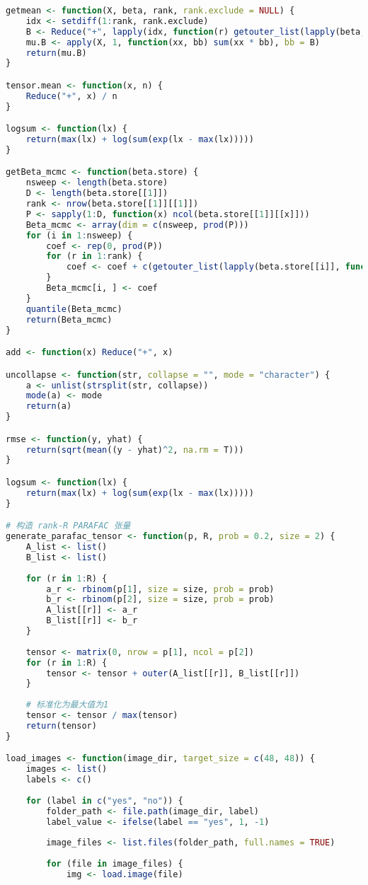 \documentclass[AutoFakeBold]{LZUThesis}
\begin{document}
\begin{lstlisting}[language=R, caption = {BT-SVM}算法]
getmean <- function(X, beta, rank, rank.exclude = NULL) {
	idx <- setdiff(1:rank, rank.exclude)
	B <- Reduce("+", lapply(idx, function(r) getouter_list(lapply(beta, function(x) x[r, ]))))
	mu.B <- apply(X, 1, function(xx, bb) sum(xx * bb), bb = B)
	return(mu.B)
}

tensor.mean <- function(x, n) {
	Reduce("+", x) / n
}

logsum <- function(lx) {
	return(max(lx) + log(sum(exp(lx - max(lx)))))
}

getBeta_mcmc <- function(beta.store) {
	nsweep <- length(beta.store)
	D <- length(beta.store[[1]])
	rank <- nrow(beta.store[[1]][[1]])
	P <- sapply(1:D, function(x) ncol(beta.store[[1]][[x]]))
	Beta_mcmc <- array(dim = c(nsweep, prod(P)))
	for (i in 1:nsweep) {
		coef <- rep(0, prod(P))
		for (r in 1:rank) {
			coef <- coef + c(getouter_list(lapply(beta.store[[i]], function(x) x[r, ])))
		}
		Beta_mcmc[i, ] <- coef
	}
	quantile(Beta_mcmc)
	return(Beta_mcmc)
}

add <- function(x) Reduce("+", x)

uncollapse <- function(str, collapse = "", mode = "character") {
	a <- unlist(strsplit(str, collapse))
	mode(a) <- mode
	return(a)
}

rmse <- function(y, yhat) {
	return(sqrt(mean((y - yhat)^2, na.rm = T)))
}

logsum <- function(lx) {
	return(max(lx) + log(sum(exp(lx - max(lx)))))
}

# 构造 rank-R PARAFAC 张量
generate_parafac_tensor <- function(p, R, prob = 0.2, size = 2) {
	A_list <- list()
	B_list <- list()
	
	for (r in 1:R) {
		a_r <- rbinom(p[1], size = size, prob = prob)
		b_r <- rbinom(p[2], size = size, prob = prob)
		A_list[[r]] <- a_r
		B_list[[r]] <- b_r
	}
	
	tensor <- matrix(0, nrow = p[1], ncol = p[2])
	for (r in 1:R) {
		tensor <- tensor + outer(A_list[[r]], B_list[[r]])
	}
	
	# 标准化为最大值为1
	tensor <- tensor / max(tensor)
	return(tensor)
}

load_images <- function(image_dir, target_size = c(48, 48)) {
	images <- list()
	labels <- c()
	
	for (label in c("yes", "no")) {
		folder_path <- file.path(image_dir, label)
		label_value <- ifelse(label == "yes", 1, -1)
		
		image_files <- list.files(folder_path, full.names = TRUE)
		
		for (file in image_files) {
			img <- load.image(file)
			

\end{lstlisting}
\end{document}
